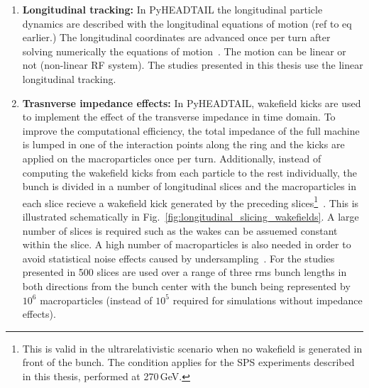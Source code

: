 {{\begin{enumerate}
    \item \textbf{Longitudinal tracking:}  In PyHEADTAIL the longitudinal particle dynamics are described with the longitudinal equations of motion (ref to eq earlier.) %
    The longitudinal coordinates are advanced once per turn after solving numerically the equations of motion~\cite{pyheadtail_schenk}. The motion can be linear or not (non-linear RF system). The studies presented in this thesis use the linear longitudinal tracking.

    \item \textbf{Trasnverse impedance effects:} In PyHEADTAIL, wakefield kicks are used to implement the effect of the transverse impedance in time domain. To improve the computational efficiency, the total impedance of the full machine is lumped in one of the interaction points along the ring and the kicks are applied on the macroparticles once per turn. Additionally, instead of computing the wakefield kicks from each particle to the rest individually, the bunch is divided in a number of longitudinal slices and the macroparticles in each slice recieve a wakefield kick generated by the preceding slices\footnote{This is valid in the ultrarelativistic scenario when no wakefield is generated in front of the bunch. The condition applies for the SPS experiments described in this thesis, performed at 270\,GeV.}~\cite{Salvant:1274254}. This is illustrated schematically in Fig.~\ref{fig:longitudinal_slicing_wakefields}. A large number of slices is required such as the wakes can be assuemed constant within the slice. A high number of macroparticles is also needed in order to avoid statistical noise effects caused by undersampling~\cite{pyheadtail_manual_adrian}. For the studies presented in 500 slices are used over a range of three rms bunch lengths in both directions from the bunch center with the bunch being represented by $10^6$ macroparticles (instead of $10^5$ required for simulations without impedance effects).
    


\end{enumerate}}}
